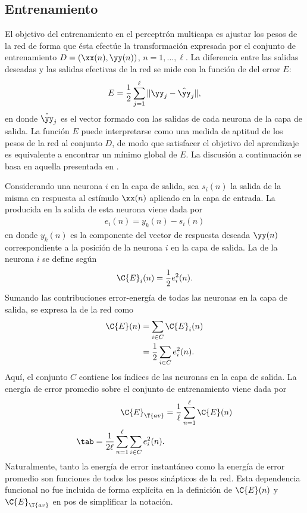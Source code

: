 %
%
\subsection{Entrenamiento}
%
El objetivo del entrenamiento en el perceptrón multicapa es ajustar
los pesos de la red de forma que ésta efectúe la transformación
expresada por el conjunto de entrenamiento $D=(\xx(n),\yy(n))$,
$n=1,\ldots,\ell$.
La diferencia entre las salidas deseadas y las salidas efectivas de la
red se mide con la función de  del error $E$:
%
\begin{align}\label{e2:energy-function}
  E = \frac{1}{2}\sum_{j=1}^{\ell}\|\yy_j-\hat{\yy}_j\|,
\end{align}
%
en donde $\hat{\yy}_j$ es el vector formado con las salidas de cada
neurona de la capa de salida.
La función $E$ puede interpretarse como una medida de {aptitud} de los
pesos de la red al conjunto $D$, de modo que satisfacer el objetivo
del aprendizaje es equivalente a encontrar un mínimo global de $E$.
La discusión a continuación se basa en aquella presentada en
\cite[Capítulo~4]{haykin}.

Considerando una neurona $i$ en la capa de salida, sea $s_i(n)$ la
salida de la misma en respuesta al estímulo $\xx(n)$ aplicado en la
capa de entrada.
La  producida en la salida de esta neurona viene
dada por
%
\begin{align}\label{e2:error-signal-neuron} %
  e_i(n)=y_{k}(n)-s_{i}(n)
\end{align}
%
en donde $y_k(n)$ es la componente del vector de respuesta deseada
$\yy(n)$ correspondiente a la posición de la neurona $i$ en la capa de
salida.
La  de la neurona $i$ se define según
%
\begin{align}\label{e2:error-energy-neuron} %
  \C{E}_i(n)=\frac{1}{2}e^2_i(n).
\end{align}
%
Sumando las contribuciones error-energía de todas las neuronas en la
capa de salida, se expresa la 
de la red como
%
\begin{align}\label{e2:error-energy-net} %
  \C{E}(n)&=\sum_{i\in C}\C{E}_i(n) \\
  &=\frac{1}{2}\sum_{i\in C}e^2_i(n).
\end{align}
%
Aquí, el conjunto $C$ contiene los índices de las neuronas en la capa
de salida.
La energía de error promedio sobre el conjunto de entrenamiento viene
dada por
%
\begin{align}\label{e2:average-energy-net} %
  \C{E}_{\T{av}}&=\frac{1}{\ell}\sum_{n=1}^\ell\C{E}(n) \\
  \tab=\frac{1}{2\ell} \sum_{n=1}^\ell \sum_{i\in C}e^2_i(n).
\end{align}
%
Naturalmente, tanto la energía de error instantáneo como la energía de
error promedio son funciones de todos los pesos sinápticos de la red.
Esta dependencia funcional no fue incluida de forma explícita en la
definición de $\C{E}(n)$ y $\C{E}_{\T{av}}$ en pos de simplificar la
notación.
